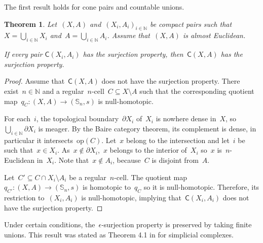 \documentclass[english,11pt]{article}
\theoremstyle{plain}
\newtheorem{theorem}{Theorem}[section]
\theoremstyle{remark}
\theoremstyle{definition}
\newcommand{\op}[1]{\mathrm{op}(#1)}
\newcommand{\Sp}{\mathbb{S}}
\newcommand{\N}{\mathbb{N}}
\newcommand{\C}[1]{\mathsf{C}(#1)}%
\begin{document}
The first result holds for cone pairs and countable unions.

\begin{theorem}\label{thm: infinite union}
Let~$(X,A)$ and~$(X_i,A_i)_{i\in\N}$ be compact pairs such that~$X=\bigcup_{i\in\N} X_i$ and~$A=\bigcup_{i\in\N} A_i$. Assume that~$(X,A)$ is almost Euclidean.

If every pair $\C{X_{i},A_{i}}$ has the surjection property, then~$\C{X,A}$ has the surjection property.
\end{theorem}

\begin{proof}
Assume that~$\C{X,A}$ does not have the surjection property. There exist~$n\in\N$ and a regular~$n$-cell~$C\subseteq X\setminus A$ such that the corresponding quotient map~$q_C:(X,A)\to(\Sp_n,s)$ is null-homotopic.

For each~$i$, the topological boundary~$\partial X_i$ of~$X_i$ is nowhere dense in~$X$, so~$\bigcup_{i\in\N}\partial X_i$ is meager. By the Baire category theorem, its complement is dense, in particular it intersects~$\op{C}$. Let~$x$ belong to the intersection and let~$i$ be such that~$x\in X_i$. As~$x\notin\partial X_i$,~$x$ belongs to the interior of~$X_i$ so~$x$ is~$n$-Euclidean in~$X_i$. Note that~$x\notin A_i$, because~$C$ is disjoint from~$A$.

Let~$C'\subseteq C\cap X_i\setminus A_i$ be a regular~$n$-cell. The quotient map~$q_{C'}:(X,A)\to (\Sp_n,s)$ is homotopic to~$q_{C}$ so it is null-homotopic. Therefore, its restriction to~$(X_i,A_i)$ is null-homotopic, implying that~$\C{X_i,A_i}$ does not have the surjection property.
\end{proof}

Under certain conditions, the~$\epsilon$-surjection property is preserved by taking finite unions. This result was stated as Theorem 4.1 in \cite{AH22} for simplicial complexes.
\end{document}
